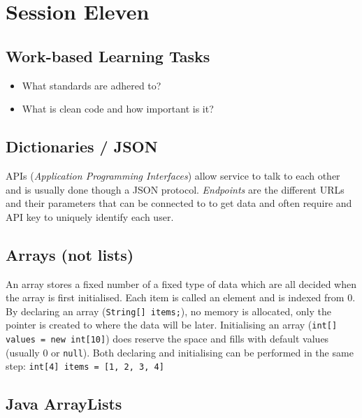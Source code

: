\section{Session Eleven}\label{sec:session_eleven}

\subsection{Work-based Learning Tasks}\label{sub:work_based_learning_tasks}

\begin{itemize}
	\item What standards are adhered to?
	\item What is clean code and how important is it?
\end{itemize}

\subsection{Dictionaries / JSON}\label{sub:dictionaries_json}

APIs (\emph{Application Programming Interfaces}) allow service to talk to each other and is usually done though a JSON protocol.
\emph{Endpoints} are the different URLs and their parameters that can be connected to to get data and often require and API key to uniquely identify each user.

\subsection{Arrays (not lists)}\label{sub:arrays_not_lists_}

An array stores a fixed number of a fixed type of data which are all decided when the array is first initialised.
Each item is called an element and is indexed from \(0\).
By declaring an array (\texttt{String[] items;}), no memory is allocated, only the pointer is created to where the data will be later.
Initialising an array (\texttt{int[] values = new int[10]}) does reserve the space and fills with default values (usually \(0\) or \texttt{null}). Both declaring and initialising can be performed in the same step: \texttt{int[4] items = [1, 2, 3, 4]}

\subsection{Java ArrayLists}\label{sub:java_arraylists}

